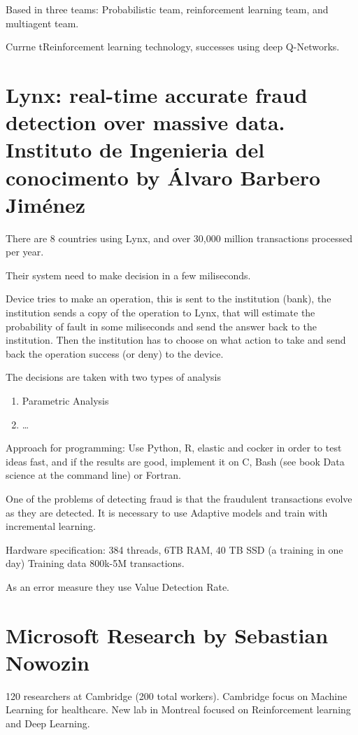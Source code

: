 \documentclass[b5paper]{report}
\begin{document}
Based in three teams: Probabilistic team, reinforcement learning team, and multiagent team.

Currne tReinforcement learning technology, successes using deep Q-Networks.

\section{Lynx: real-time accurate fraud detection over massive data.
Instituto de Ingenieria del conocimento by Álvaro Barbero Jiménez}

There are 8 countries using Lynx, and over 30,000 million transactions
processed per year.

Their system need to make decision in a few miliseconds.

Device tries to make an operation, this is sent to the institution (bank), the
institution sends a copy of the operation to Lynx, that will estimate the
probability of fault in some miliseconds and send the answer back to the
institution. Then the institution has to choose on what action to take and send
back the operation success (or deny) to the device.

The decisions are taken with two types of analysis

\begin{enumerate}
  \item Parametric Analysis
  \item \dots
\end{enumerate}

Approach for programming: Use Python, R, elastic and cocker in order to test
ideas fast, and if the results are good, implement it on C, Bash (see book Data
science at the command line) or Fortran.

One of the problems of detecting fraud is that the fraudulent transactions
evolve as they are detected. It is necessary to use Adaptive models and train
with incremental learning.

Hardware specification: 384 threads, 6TB RAM, 40 TB SSD (a training in one day)
Training data 800k-5M transactions.

As an error measure they use Value Detection Rate.

\section{Microsoft Research by Sebastian Nowozin}

120 researchers at Cambridge (200 total workers). Cambridge focus on Machine
Learning for healthcare. New lab in Montreal focused on Reinforcement learning
and Deep Learning.
\end{document}
